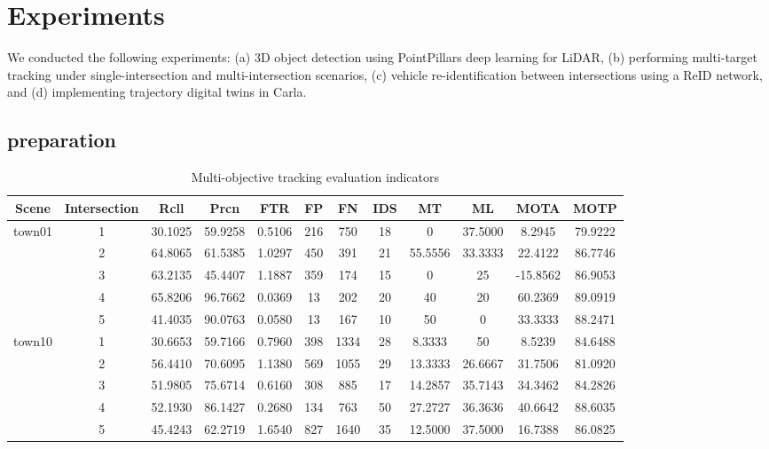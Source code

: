 \section{Experiments}

We conducted the following experiments: 
(a) 3D object detection using PointPillars deep learning for LiDAR, 
(b) performing multi-target tracking under single-intersection and multi-intersection scenarios, 
(c) vehicle re-identification between intersections using a ReID network, and 
(d) implementing trajectory digital twins in Carla.

\subsection{preparation}

\begin{table*}[t] 
	\centering
	\caption{Multi-objective tracking evaluation indicators}
	\label{tab:example}
	\begin{tabular}{cccccccccccc}
		\toprule
		Scene & Intersection & Rcll & Prcn & FTR & FP & FN & IDS & MT & ML & MOTA & MOTP\\
		\midrule
		town01 & 1 & 30.1025 & 59.9258 & 0.5106 & 216 & 750 & 18 & 0 & 37.5000 & 8.2945 & 79.9222\\
		& 2 & 64.8065 & 61.5385 & 1.0297 & 450 & 391 & 21 & 55.5556 & 33.3333 & 22.4122 & 86.7746\\
		& 3 & 63.2135 & 45.4407 & 1.1887 & 359 & 174 & 15 & 0 & 25 & -15.8562 & 86.9053\\
		& 4 & 65.8206 & 96.7662 & 0.0369 & 13 & 202 & 20 & 40 & 20 & 60.2369 & 89.0919\\
		& 5 & 41.4035 & 90.0763 & 0.0580 & 13 & 167 & 10 & 50 & 0 & 33.3333 & 88.2471\\
		\hline
		town10 & 1 & 30.6653 & 59.7166 & 0.7960 & 398 & 1334 & 28 & 8.3333 & 50 & 8.5239 & 84.6488\\
		& 2 & 56.4410 & 70.6095 & 1.1380 & 569 & 1055 & 29 & 13.3333 & 26.6667 & 31.7506 & 81.0920\\
		& 3 & 51.9805 & 75.6714 & 0.6160 & 308 & 885 & 17 & 14.2857 & 35.7143 & 34.3462 & 84.2826\\
		& 4 & 52.1930 & 86.1427 & 0.2680 & 134 & 763 & 50 & 27.2727 & 36.3636 & 40.6642 & 88.6035\\
		& 5 & 45.4243 & 62.2719 & 1.6540 & 827 & 1640 & 35 & 12.5000 & 37.5000 & 16.7388 & 86.0825\\
		\bottomrule
	\end{tabular}
\end{table*}

